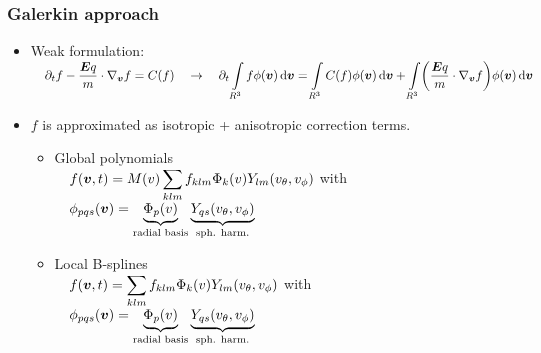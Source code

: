 \documentclass[mathserif, aspectratio=169]{beamer}
\newcommand{\ud}{\,\mathrm{d}}
\newcommand{\vect}[1]{\boldsymbol{#1}}
\newcommand{\of}[1]{\mleft( #1 \mright)}
\newcommand{\myint}{\int\limits}
\begin{document}
\begin{frame}
	\frametitle{Galerkin approach}
	\small
	\begin{itemize}
		\item Weak formulation:
		$
		\displaystyle
		\quad
		\partial_t f - \frac{\vect{E} q}{m} \cdot \nabla_{\vect{v}}f = C(f)
		\quad \rightarrow \quad
		\partial_t \myint_{R^3} f \phi\of{\vect{v}} \ud \vect{v} = 
		\myint_{R^3} C(f) \phi\of{\vect{v}} \ud \vect{v} + \myint_{R^3} \of{\frac{\vect{E} q}{m} \cdot \nabla_{\vect{v}} f} \phi(\vect{v}) \ud \vect{v}
		$
		\item $f$ is approximated as isotropic + anisotropic correction terms.
		\begin{itemize}
			\item Global polynomials \\
			$
			\displaystyle
			\quad 
			f(\vect{v},t) = M(v)\sum_{klm} f_{klm} \Phi_k\of{v} Y_{lm}\of{v_\theta, v_\phi}$ with $
			\displaystyle
			\quad 
			\phi_{pqs}\of{\vect{v}} = \underbrace{\Phi_p\of{v}}_{\text{radial basis}} \underbrace{Y_{qs}\of{v_\theta, v_\phi}}_{\tiny\text{sph. harm.}}$
			\item Local B-splines \\
			$
			\displaystyle
			\quad 
			f(\vect{v},t) = \sum_{klm} f_{klm} \Phi_k\of{v} Y_{lm}\of{v_\theta, v_\phi}$ with $
			\displaystyle
			\quad 
			\phi_{pqs}\of{\vect{v}} = \underbrace{\Phi_p\of{v}}_{\text{radial basis}} \underbrace{Y_{qs}\of{v_\theta, v_\phi}}_{\tiny\text{sph. harm.}}$
		\end{itemize}
	\end{itemize}
\end{frame}
\end{document}
